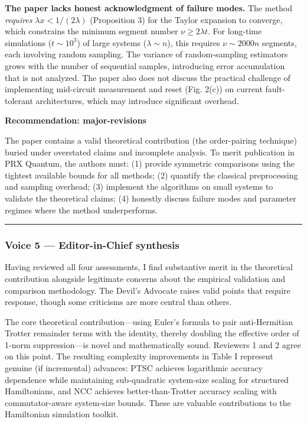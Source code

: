 \documentclass[10pt,letterpaper]{article}
\begin{document}
\textbf{The paper lacks honest acknowledgment of failure modes.} The method \emph{requires} \(\lambda x < 1/(2\lambda)\) (Proposition 3) for the Taylor expansion to converge, which constrains the minimum segment number \(\nu \geq 2\lambda t\). For long-time simulations (\(t \sim 10^3\)) of large systems (\(\lambda \sim n\)), this requires \(\nu \sim 2000n\) segments, each involving random sampling. The variance of random-sampling estimators grows with the number of sequential samples, introducing error accumulation that is not analyzed. The paper also does not discuss the practical challenge of implementing mid-circuit measurement and reset (Fig. 2(c)) on current fault-tolerant architectures, which may introduce significant overhead.

\textbf{Recommendation: major-revisions}

The paper contains a valid theoretical contribution (the order-pairing technique) buried under overstated claims and incomplete analysis. To merit publication in PRX Quantum, the authors must: (1) provide symmetric comparisons using the tightest available bounds for all methods; (2) quantify the classical preprocessing and sampling overhead; (3) implement the algorithms on small systems to validate the theoretical claims; (4) honestly discuss failure modes and parameter regimes where the method underperforms.

\begin{center}\rule{0.5\linewidth}{0.5pt}\end{center}

\hypertarget{voice-5-editor-in-chief-synthesis}{%
\subsubsection{Voice 5 --- Editor-in-Chief synthesis}\label{voice-5-editor-in-chief-synthesis}}

Having reviewed all four assessments, I find substantive merit in the theoretical contribution alongside legitimate concerns about the empirical validation and comparison methodology. The Devil's Advocate raises valid points that require response, though some criticisms are more central than others.

The core theoretical contribution---using Euler's formula to pair anti-Hermitian Trotter remainder terms with the identity, thereby doubling the effective order of 1-norm suppression---is novel and mathematically sound. Reviewers 1 and 2 agree on this point. The resulting complexity improvements in Table I represent genuine (if incremental) advances: PTSC achieves logarithmic accuracy dependence while maintaining sub-quadratic system-size scaling for structured Hamiltonians, and NCC achieves better-than-Trotter accuracy scaling with commutator-aware system-size bounds. These are valuable contributions to the Hamiltonian simulation toolkit.
\end{document}
